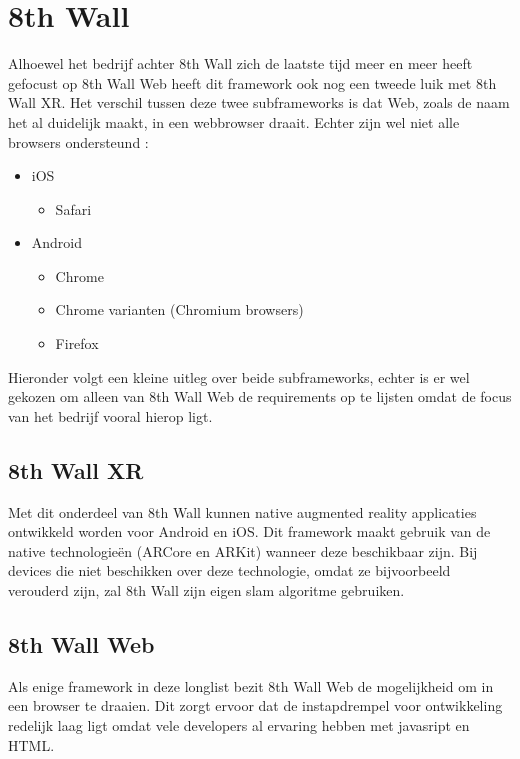 \section{8th Wall}
Alhoewel het bedrijf achter 8th Wall zich de laatste tijd meer en meer heeft gefocust op 8th Wall Web heeft dit framework ook nog een tweede luik met 8th Wall XR. Het verschil tussen deze twee subframeworks is dat Web, zoals de naam het al duidelijk maakt, in een webbrowser draait. Echter zijn wel niet alle browsers ondersteund \autocite{8thWallWebReq}:
\begin{itemize}
    \item iOS
    \begin{itemize}
        \item Safari
    \end{itemize}
    \item Android
    \begin{itemize}
        \item Chrome
        \item Chrome varianten (Chromium browsers)
        \item Firefox
    \end{itemize}
\end{itemize} 


Hieronder volgt een kleine uitleg over beide subframeworks, echter is er wel gekozen om alleen van 8th Wall Web de requirements op te lijsten omdat de focus van het bedrijf vooral hierop ligt.

\subsection{8th Wall XR}
Met dit onderdeel van 8th Wall kunnen native augmented reality applicaties ontwikkeld worden voor Android en iOS. Dit framework maakt gebruik van de native technologieën (ARCore en ARKit) wanneer deze beschikbaar zijn. Bij devices die niet beschikken over deze technologie, omdat ze bijvoorbeeld verouderd zijn, zal 8th Wall zijn eigen \acrshort{slam} algoritme gebruiken.

\subsection{8th Wall Web}
Als enige framework in deze longlist bezit 8th Wall Web de mogelijkheid om in een browser te draaien. Dit zorgt ervoor dat de instapdrempel voor ontwikkeling redelijk laag ligt omdat vele developers al ervaring hebben met javasript en HTML.

